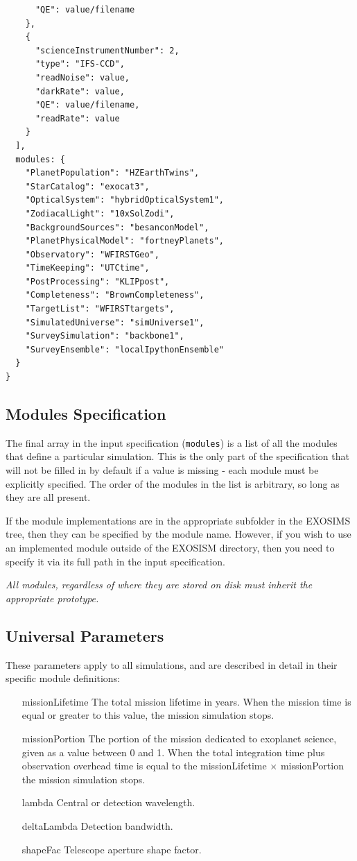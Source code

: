 \documentclass[cleanfoot]{asme2ej}
\begin{document}
\begin{verbatim}
      "QE": value/filename
    },
    {
      "scienceInstrumentNumber": 2,
      "type": "IFS-CCD",
      "readNoise": value,
      "darkRate": value,
      "QE": value/filename,
      "readRate": value
    }
  ],
  modules: {
    "PlanetPopulation": "HZEarthTwins",
    "StarCatalog": "exocat3",
    "OpticalSystem": "hybridOpticalSystem1",
    "ZodiacalLight": "10xSolZodi",
    "BackgroundSources": "besanconModel",
    "PlanetPhysicalModel": "fortneyPlanets",
    "Observatory": "WFIRSTGeo",
    "TimeKeeping": "UTCtime",
    "PostProcessing": "KLIPpost",
    "Completeness": "BrownCompleteness",
    "TargetList": "WFIRSTtargets",
    "SimulatedUniverse": "simUniverse1",
    "SurveySimulation": "backbone1",
    "SurveyEnsemble": "localIpythonEnsemble"
  }
}
\end{verbatim}

\subsection{Modules Specification}
The final array in the input specification  (\verb+modules+) is a list of all the modules that define a particular simulation.  This is the only part of the specification that will not be filled in by default if a value is missing - each module must be explicitly specified. The order of the modules in the list is arbitrary, so long as they are all present. 

If the module implementations are in the appropriate subfolder in the EXOSIMS tree, then they can be specified by the module name.  However, if you wish to use an implemented module outside of the EXOSISM directory, then you need to specify it via its full path in the input specification.

\emph{All modules, regardless of where they are stored on disk must inherit the appropriate prototype.}

\subsection{Universal Parameters}
These parameters apply to all simulations, and are described in detail in their specific module definitions:

\begin{itemize}[leftmargin=1in,font={\ttfamily}]
\item[missionLifetime]  The total mission lifetime in years.  When the mission time is equal or greater to this value, the mission simulation stops.
\item[missionPortion]  The portion of the mission dedicated to exoplanet science, given as a value between 0 and 1.  When the total integration time plus observation overhead time is equal to the missionLifetime $\times$ missionPortion the mission simulation stops.
\item[lambda]  Central or detection wavelength.
\item[deltaLambda]  Detection bandwidth.
\item[shapeFac]  Telescope aperture shape factor.
\end{itemize}
\end{document}
